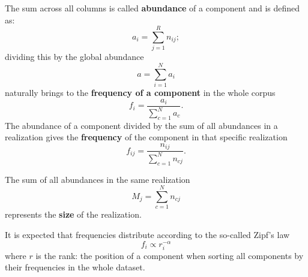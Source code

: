 The sum across all columns is called \textbf{abundance} of a component and is defined as:
\begin{equation}\label{eq:abundance}
a_i=\sum_{j=1}^{R}n_{ij};
\end{equation}
dividing this by the global abundance 
\begin{equation}
  a=\sum_{i=1}^{N}a_i
\end{equation}
naturally brings to the \textbf{frequency of a component} in the whole corpus
\begin{equation}\label{eq:fi}
f_i=\frac{a_i}{\sum_{c=1}^{N}a_{c}}.
\end{equation}
The abundance of a component divided by the sum of all abundances in a realization gives the \textbf{frequency} of the component in that specific realization
\begin{equation}
f_{ij}=\frac{n_{ij}}{\sum_{c=1}^{N}n_{cj}}.
\end{equation}

The sum of all abundances in the same realization
\begin{equation}\label{eq:size}
M_j=\sum_{c=1}^{N}n_{cj}
\end{equation}
represents the \textbf{size} of the realization.

It is expected that frequencies distribute according to the so-called Zipf's law
\begin{equation}\label{eq:zipf}
f_i\propto r_i^{-\alpha}
\end{equation}
where $r$ is the rank: the position of a component when sorting all components by their frequencies in the whole dataset.